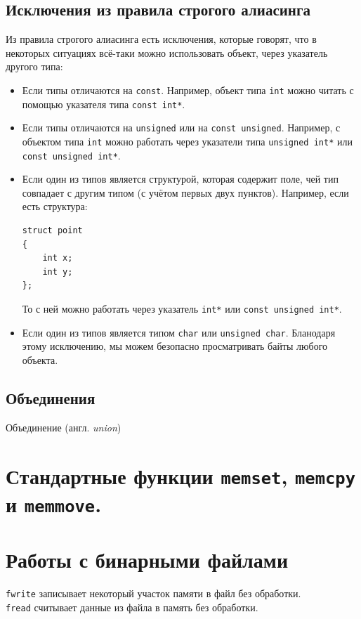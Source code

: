 \documentclass{article}
\begin{document}
\subsection*{Исключения из правила строгого алиасинга}
Из правила строгого алиасинга есть исключения, которые говорят, что в некоторых ситуациях всё-таки можно использовать объект, через указатель другого типа:
\begin{itemize}
\item Если типы отличаются на \texttt{const}. Например, объект типа \texttt{int} можно читать с помощью указателя типа \texttt{const int*}. 

\item Если типы отличаются на \texttt{unsigned} или на \texttt{const unsigned}. Например, с объектом типа \texttt{int} можно работать через указатели типа \texttt{unsigned int*} или \texttt{const unsigned int*}. 

\item Если один из типов является структурой, которая содержит поле, чей тип совпадает с другим типом (с учётом первых двух пунктов). Например, если есть структура:
 \begin{lstlisting}
struct point
{
	int x;
	int y;
};
\end{lstlisting}
То с ней можно работать через указатель \texttt{int*} или \texttt{const unsigned int*}.

\item Если один из типов является типом \texttt{char} или \texttt{unsigned char}. Бланодаря этому исключению, мы можем безопасно просматривать байты любого объекта.
\end{itemize}

\subsection*{Объединения}
Объединение (англ. \textit{union})


\newpage
\section*{Стандартные функции \texttt{memset}, \texttt{memcpy} и \texttt{memmove}.}




\newpage
\section*{Работы с бинарными файлами}
\texttt{fwrite} записывает некоторый участок памяти в файл без обработки. \\
\texttt{fread} считывает данные из файла в память без обработки.
\end{document}
